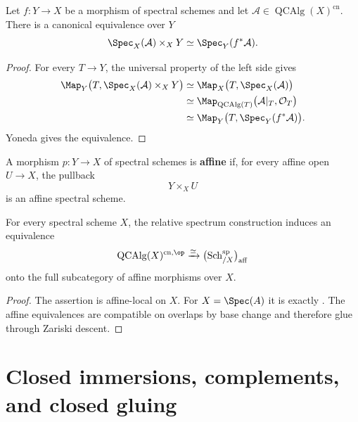 \begin{proposition}
\label{prop:relative-spectrum-base-change}
Let $f:Y\to X$ be a morphism of spectral schemes and let
$\mathcal A\in\operatorname{QCAlg}(X)^{\mathrm{cn}}$. There is a canonical
equivalence over $Y$
\[
    \Spec_X(\mathcal A)
    \times_X
    Y
    \simeq
    \Spec_Y(f^*\mathcal A).
\]
\end{proposition}

\begin{proof}
For every $T\to Y$, the universal property of the left side gives
\[
\begin{aligned}
    \Map_Y
    \bigl(
        T,
        \Spec_X(\mathcal A)\times_XY
    \bigr)
    &\simeq
    \Map_X
    \bigl(
        T,
        \Spec_X(\mathcal A)
    \bigr)
    \\
    &\simeq
    \Map_{\operatorname{QCAlg}(T)}
    \bigl(
        \mathcal A|_T,
        \mathcal O_T
    \bigr)
    \\
    &\simeq
    \Map_Y
    \bigl(
        T,
        \Spec_Y(f^*\mathcal A)
    \bigr).
\end{aligned}
\]
Yoneda gives the equivalence.
\end{proof}

\begin{definition}
\label{def:affine-morphism-spectral-schemes}
A morphism $p:Y\to X$ of spectral schemes is \textbf{affine} if, for every
affine open $U\to X$, the pullback
\[
    Y\times_XU
\]
is an affine spectral scheme.
\end{definition}

\begin{theorem}
\label{thm:classification-affine-morphisms}
For every spectral scheme $X$, the relative spectrum construction induces
an equivalence
\[
    \operatorname{QCAlg}(X)^{\mathrm{cn},\op}
    \xrightarrow{\simeq}
    \bigl(
        \operatorname{Sch}^{\mathrm{sp}}_{/X}
    \bigr)_{\mathrm{aff}}
\]
onto the full subcategory of affine morphisms over $X$.
\end{theorem}

\begin{proof}
The assertion is affine-local on $X$. For $X=\Spec(A)$ it is exactly
. The affine equivalences are
compatible on overlaps by base change and therefore glue through Zariski
descent.
\end{proof}

\section{Closed immersions, complements, and closed gluing}
\label{sec:closed-immersions-complements}

